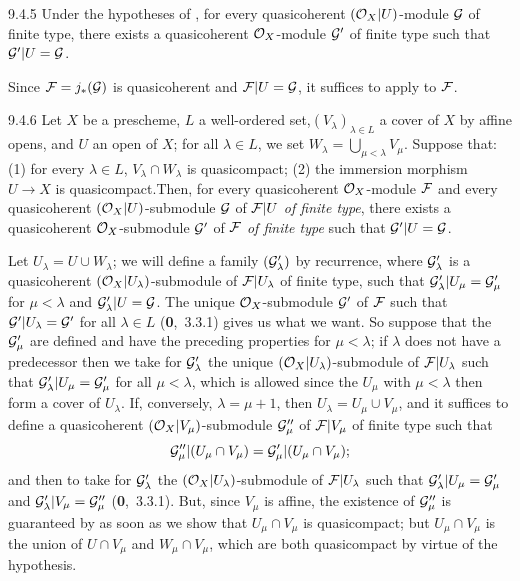 \begin{env}[Corollary]{9.4.5}
\label{cor-1.9.4.5}
Under the hypotheses of , for every quasicoherent $(\mathcal{O}_X|U)$-module
$\mathcal{G}$ of finite type, there exists a quasicoherent $\mathcal{O}_X$-module
$\mathcal{G}'$ of finite type such that $\mathcal{G}'|U=\mathcal{G}$.
\end{env}

Since $\mathcal{F}=j_\ast(\mathcal{G})$ is quasicoherent  and
$\mathcal{F}|U=\mathcal{G}$, it suffices to apply  to $\mathcal{F}$.

\begin{env}[Lemma]{9.4.6}
\label{lem-1.9.4.6}
Let $X$ be a prescheme, $L$ a well-ordered set,$(V_\lambda)_{\lambda\in L}$ a cover
of $X$ by affine opens, and $U$ an open of
$X$; for all $\lambda\in L$, we set $W_\lambda=\bigcup_{\mu<\lambda}V_\mu$.
Suppose that: (1) for every $\lambda\in L$, $V_\lambda\cap W_\lambda$ is
quasicompact; (2) the immersion morphism $U\to X$ is quasicompact.Then, for
every quasicoherent $\mathcal{O}_X$-module $\mathcal{F}$ and every quasicoherent
$(\mathcal{O}_X|U)$-submodule $\mathcal{G}$ of $\mathcal{F}|U$ \emph{of finite type}, there
exists a quasicoherent $\mathcal{O}_X$-submodule $\mathcal{G}'$ of $\mathcal{F}$ \emph{of
finite type} such that $\mathcal{G}'|U=\mathcal{G}$.
\end{env}

Let $U_\lambda=U\cup W_\lambda$; we will define a family $(\mathcal{G}'_\lambda)$
by recurrence, where $\mathcal{G}'_\lambda$ is a quasicoherent
$(\mathcal{O}_X|U_\lambda)$-submodule of $\mathcal{F}|U_\lambda$ of finite type, such that
$\mathcal{G}'_\lambda|U_\mu=\mathcal{G}'_\mu$ for $\mu<\lambda$ and
$\mathcal{G}'_\lambda|U=\mathcal{G}$. The unique $\mathcal{O}_X$-submodule $\mathcal{G}'$ of
$\mathcal{F}$ such that $\mathcal{G}'|U_\lambda=\mathcal{G}'$ for all $\lambda\in L$
(\textbf{0},~3.3.1) gives us what we want. So suppose that the $\mathcal{G}'_\mu$
are defined and have the preceding properties for $\mu<\lambda$; if $\lambda$
does not have a predecessor then we take for $\mathcal{G}'_\lambda$ the unique
$(\mathcal{O}_X|U_\lambda)$-submodule of $\mathcal{F}|U_\lambda$ such that
$\mathcal{G}'_\lambda|U_\mu=\mathcal{G}'_\mu$ for all $\mu<\lambda$, which is
allowed since the $U_\mu$ with $\mu<\lambda$ then form a cover of $U_\lambda$.
If, conversely, $\lambda=\mu+1$, then $U_\lambda=U_\mu\cup V_\mu$, and it
suffices to define a quasicoherent $(\mathcal{O}_X|V_\mu)$-submodule $\mathcal{G}''_\mu$
of $\mathcal{F}|V_\mu$ of finite type such that
\[
  \mathcal{G}''_\mu|(U_\mu\cap V_\mu)=\mathcal{G}'_\mu|(U_\mu\cap V_\mu);
\]
and then to take for $\mathcal{G}'_\lambda$ the
$(\mathcal{O}_X|U_\lambda)$-submodule of $\mathcal{F}|U_\lambda$ such that
$\mathcal{G}'_\lambda|U_\mu=\mathcal{G}'_\mu$ and
$\mathcal{G}'_\lambda|V_\mu=\mathcal{G}''_\mu$ (\textbf{0},~3.3.1). But, since
$V_\mu$ is affine, the existence of $\mathcal{G}''_\mu$ is guaranteed by 
as soon as we show that $U_\mu\cap V_\mu$ is quasicompact; but $U_\mu\cap V_\mu$
is the union of $U\cap V_\mu$ and $W_\mu\cap V_\mu$, which are both
quasicompact by virtue of the hypothesis.

